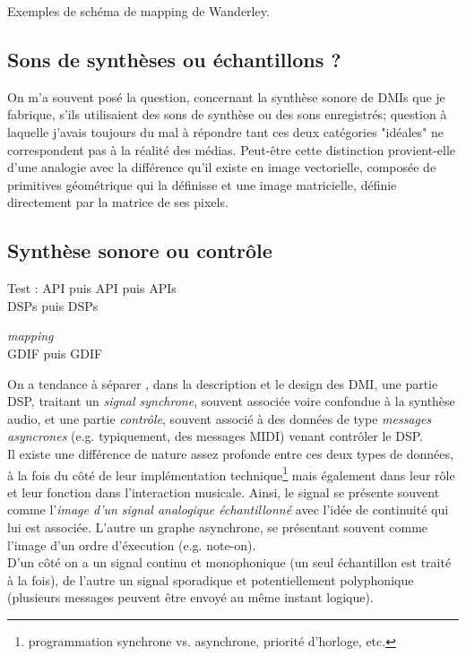 Exemples de schéma de mapping de Wanderley.

\subsection{Sons de synthèses ou échantillons ?}

On m'a souvent posé la question, concernant la synthèse sonore de DMIs que je fabrique, s'ils utilisaient des sons de synthèse ou des sons enregistrés; question à laquelle j'avais toujours du mal à répondre tant ces deux catégories "idéales" ne correspondent pas à la réalité des médias. 
Peut-être cette distinction provient-elle d'une analogie avec la différence qu'il existe en image vectorielle, composée de primitives géométrique qui la définisse et une image matricielle, définie directement par la matrice de ses pixels.

\subsection{Synthèse sonore ou contrôle}

Test : \gls{API} puis \gls{API} puis \glspl{API} \\
\glspl{DSP} puis \glspl{DSP}

\textit{\gls{mapping}}\\

\gls{GDIF} puis \gls{GDIF}


On a tendance à séparer , dans la description et le design des DMI, une partie \gls{DSP}, traitant un \textit{signal synchrone}, souvent associée voire confondue à la synthèse audio, et une partie \textit{contrôle}, souvent associé à des données de type \textit{messages asyncrones} (e.g. typiquement, des messages MIDI) venant contrôler le DSP.\\
Il existe une différence de nature assez profonde entre ces deux types de données, à la fois du côté de leur implémentation technique\footnote{programmation synchrone vs. asynchrone, priorité d'horloge, etc.} mais également dans leur rôle et leur fonction dans l'interaction musicale. 
Ainsi, le signal se présente souvent comme l'\textit{image d'un signal analogique échantillonné} avec l'idée de continuité qui lui est associée. L'autre un graphe asynchrone, se présentant souvent comme l'image d'un ordre d'éxecution (e.g. note-on). \\
D'un côté on a un signal continu et monophonique (un seul échantillon est traité à la fois), de l'autre un signal sporadique et potentiellement polyphonique (plusieurs messages peuvent être envoyé au même instant logique).\\

